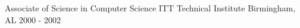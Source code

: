 
\begin{cventries}
  \cventry
    {Associate of Science in Computer Science} %
    {ITT Technical Institute} %
    {Birmingham, AL} %
    {2000 - 2002} %
    {}

\end{cventries}
